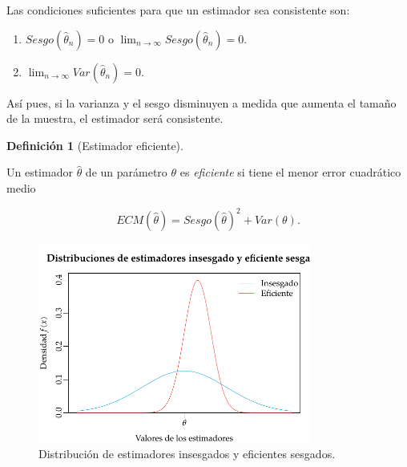 \documentclass[
  a4paper,
]{scrreport}
\providecommand{\tightlist}{%
  \setlength{\itemsep}{0pt}\setlength{\parskip}{0pt}}\usepackage{longtable,booktabs,array}
\theoremstyle{plain}
\theoremstyle{definition}
\newtheorem{definition}{Definición}[chapter]
\theoremstyle{definition}
\theoremstyle{remark}
\begin{document}
\begin{figure}
\begin{minipage}{0.50\linewidth}
\end{minipage}%

\end{figure}%

Las condiciones suficientes para que un estimador sea consistente son:

\begin{enumerate}
\def\labelenumi{\arabic{enumi}.}
\tightlist
\item
  \(Sesgo(\hat \theta_n)=0\) o
  \(\lim_{n\rightarrow \infty}Sesgo(\hat \theta_n)=0\).
\item
  \(\lim_{n\rightarrow \infty}Var(\hat \theta_n)=0\).
\end{enumerate}

Así pues, si la varianza y el sesgo disminuyen a medida que aumenta el
tamaño de la muestra, el estimador será consistente.

\begin{definition}[Estimador
eficiente]\protect\hypertarget{def-estimador-eficiente}{}\label{def-estimador-eficiente}

Un estimador \(\hat \theta\) de un parámetro \(\theta\) es
\emph{eficiente} si tiene el menor error cuadrático medio

\[
ECM(\hat \theta) = Sesgo(\hat \theta)^2+Var(\theta).
\]

\end{definition}

\begin{figure}[H]

{\centering \includegraphics[width=0.8\textwidth,height=\textheight]{img/estimacion/estimador-eficiente-sesgado.pdf}

}

\caption{Distribución de estimadores insesgados y eficientes sesgados.}

\end{figure}%
\end{document}
